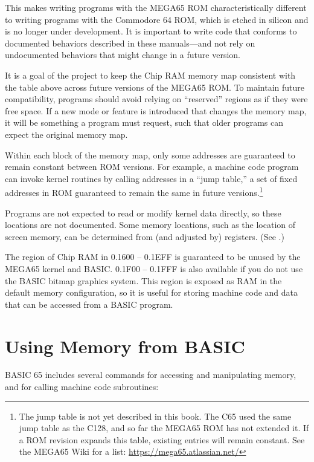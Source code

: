 This makes writing programs with the MEGA65 ROM characteristically different
to writing programs with the Commodore 64 ROM, which is etched in silicon
and is no longer under development. It is important to write code that
conforms to documented behaviors described in these manuals---and not rely on
undocumented behaviors that might change in a future version.

It is a goal of the project to keep the Chip RAM memory map consistent with
the table above across future versions of the MEGA65 ROM. To maintain future
compatibility, programs should avoid relying on ``reserved'' regions as if
they were free space. If a new mode or feature is introduced that changes the
memory map, it will be something a program must request, such that older
programs can expect the original memory map.

Within each block of the memory map, only some addresses are guaranteed to
remain constant between ROM versions. For example, a machine code program can
invoke kernel routines by calling addresses in a ``jump table,'' a set of
fixed addresses in ROM guaranteed to remain the same in future
versions.\footnote{The jump table is not yet described in this book. The C65
used the same jump table as the C128, and so far the MEGA65 ROM has not
extended it. If a ROM revision expands this table, existing entries will
remain constant. See the MEGA65 Wiki for a list:
\url{https://mega65.atlassian.net/}}

Programs are not expected to read or modify kernel data directly, so these
locations are not documented. Some memory locations, such as the location of
screen memory, can be determined from (and adjusted by) registers. (See
.)

The region of Chip RAM in 0.1600 -- 0.1EFF is guaranteed to be unused by the
MEGA65 kernel and BASIC. 0.1F00 -- 0.1FFF is also available if you do not use the
BASIC bitmap graphics system. This region is exposed as RAM in the default memory
configuration, so it is useful for storing machine code and data that can be
accessed from a BASIC program.


\newpage
\section{Using Memory from BASIC}

BASIC 65 includes several commands for accessing and manipulating memory, and
for calling machine code subroutines:

